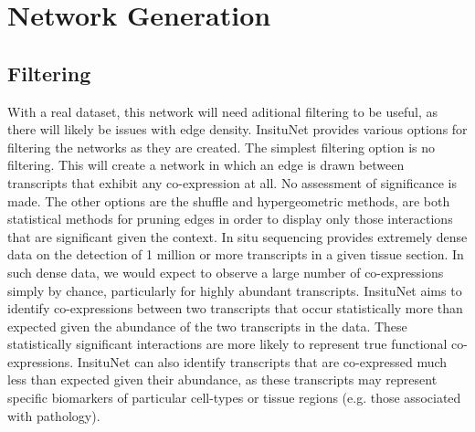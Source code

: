 \documentclass[a4paper,12pt]{article}
\begin{document}
\section{Network Generation}

\subsection{Filtering}
With a real dataset, this network will need aditional filtering to be useful, as there will likely be issues with edge density. InsituNet provides various options for filtering the networks as they are created. The simplest filtering option is no filtering. This will create a network in which an edge is drawn between transcripts that exhibit any co-expression at all. No assessment of significance is made. The other options are the shuffle and hypergeometric methods, are both statistical methods for pruning edges in order to display only those interactions that are significant given the context.
In situ sequencing provides extremely dense data on the detection of 1 million or more transcripts in a given tissue section. In such dense data, we would expect to observe a large number of co-expressions simply by chance, particularly for highly abundant transcripts. InsituNet aims to identify co-expressions between two transcripts that occur statistically more than expected given the abundance of the two transcripts in the data. These statistically significant interactions are more likely to represent true functional co-expressions. InsituNet can also identify transcripts that are co-expressed much less than expected given their abundance, as these transcripts may represent specific biomarkers of particular cell-types or tissue regions (e.g. those associated with pathology).
\end{document}
